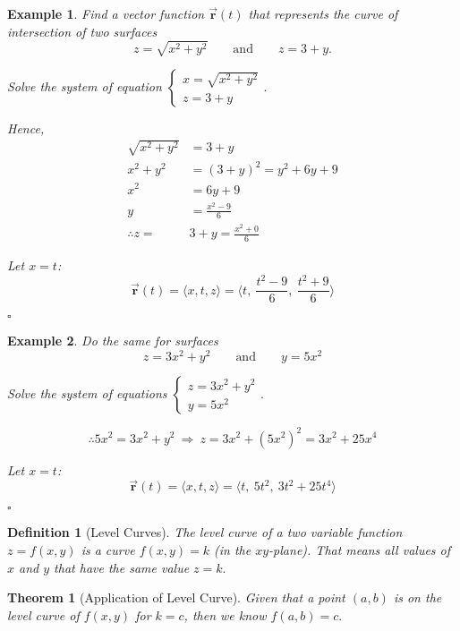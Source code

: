 \documentclass[12pt,a4paper]{article}
\newtheorem{thm}{Theorem}[subsection]
\newtheorem{df}{Definition}[subsection]
\newtheorem{eg}{Example}[subsection]
\newenvironment*{ans}{\par\indent{\textit{Answer. }}\par}{\par\hfill{$\square$}\par}
\def\vecr{\vec{\boldsymbol{\textbf{r}}}}
\begin{document}
\begin{eg}
	Find a vector function $\vecr(t)$ that represents the curve of intersection of two surfaces\[z=\sqrt{x^2+y^2}\qquad\text{and}\qquad z=3+y.\]
	\begin{ans}
		Solve the system of equation $\begin{cases}x=\sqrt{x^2+y^2}\\z=3+y\end{cases}.$\par
		Hence, \[\begin{aligned}
			\sqrt{x^2+y^2}&=3+y\\
			x^2+y^2&=(3+y)^2=y^2+6y+9\\
			x^2&=6y+9\\
			y&=\frac{x^2-9}{6}\\
			\therefore z=&3+y=\frac{x^2+0}{6}
 		\end{aligned}\]\par 
 		Let $x=t$: \[\vecr(t)=\langle x,t,z\rangle=\Big\langle t,\ \frac{t^2-9}{6},\ \frac{t^2+9}{6}\Big\rangle\]
	\end{ans}
\end{eg}
\begin{eg}
	Do the same for surfaces\[z=3x^2+y^2\qquad\text{and}\qquad y=5x^2\]
	\begin{ans}
		Solve the system of equations $\begin{cases}z=3x^2+y^2\\y=5x^2\end{cases}.$\par
		\[\therefore 5x^2=3x^2+y^2\ \Longrightarrow\ z=3x^2+(5x^2)^2=3x^2+25x^4\]\par 
		Let $x=t$: \[\vecr(t)=\langle x,t,z\rangle=\Big\langle t,\ 5t^2,\ 3t^2+25t^4\Big\rangle\]	
	\end{ans}
\end{eg}
\begin{df}[Level Curves]
	The level curve of a two variable function $z=f(x,y)$ is a curve $f(x,y)=k$ (in the $xy$-plane). That means all values of $x$ and $y$ that have the same value $z=k.$
\end{df}
\begin{thm}[Application of Level Curve]
	Given that a point $(a,b)$ is on the level curve of $f(x,y)$ for $k=c$, then we know $f(a,b)=c.$	
\end{thm}
\end{document}
